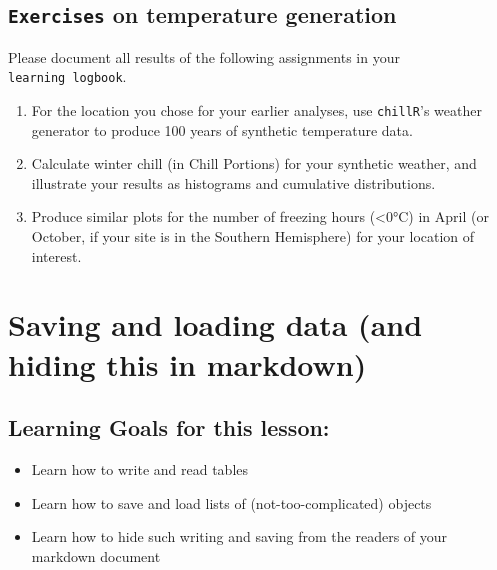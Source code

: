 \documentclass[
]{book}
\providecommand{\tightlist}{%
  \setlength{\itemsep}{0pt}\setlength{\parskip}{0pt}}
\begin{document}
\hypertarget{weather_generation_exercises}{%
\section*{\texorpdfstring{\texttt{Exercises} on temperature generation}{Exercises on temperature generation}}\label{weather_generation_exercises}}

Please document all results of the following assignments in your \texttt{learning\ logbook}.

\begin{enumerate}
\def\labelenumi{\arabic{enumi})}
\tightlist
\item
  For the location you chose for your earlier analyses, use \texttt{chillR}'s weather generator to produce 100 years of synthetic temperature data.
\item
  Calculate winter chill (in Chill Portions) for your synthetic weather, and illustrate your results as histograms and cumulative distributions.
\item
  Produce similar plots for the number of freezing hours (\textless0°C) in April (or October, if your site is in the Southern Hemisphere) for your location of interest.
\end{enumerate}

\hypertarget{saving-and-loading-data-and-hiding-this-in-markdown}{%
\chapter{Saving and loading data (and hiding this in markdown)}\label{saving-and-loading-data-and-hiding-this-in-markdown}}

\hypertarget{learning-goals-for-this-lesson-1}{%
\section{Learning Goals for this lesson:}\label{learning-goals-for-this-lesson-1}}

\begin{itemize}
\tightlist
\item
  Learn how to write and read tables
\item
  Learn how to save and load lists of (not-too-complicated) objects
\item
  Learn how to hide such writing and saving from the readers of your markdown document
\end{itemize}
\end{document}
